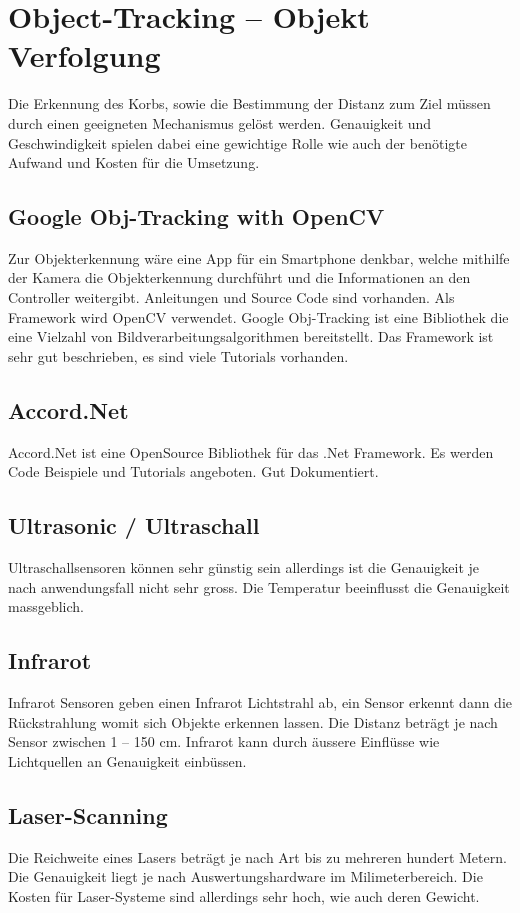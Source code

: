 \section{Object-Tracking – Objekt Verfolgung}
Die Erkennung des Korbs, sowie die Bestimmung der Distanz zum Ziel müssen durch einen geeigneten Mechanismus gelöst werden. Genauigkeit und Geschwindigkeit spielen dabei eine gewichtige Rolle wie auch der benötigte Aufwand und Kosten für die Umsetzung.

\subsection{Google Obj-Tracking with OpenCV}
Zur Objekterkennung wäre eine App für ein Smartphone denkbar, welche mithilfe der Kamera die Objekterkennung durchführt und die Informationen an den Controller weitergibt. Anleitungen und Source Code sind vorhanden. Als Framework wird OpenCV verwendet. Google Obj-Tracking ist eine Bibliothek die eine Vielzahl von Bildverarbeitungsalgorithmen bereitstellt. Das Framework ist sehr gut beschrieben, es sind viele Tutorials vorhanden.

\subsection{Accord.Net}
Accord.Net ist eine OpenSource Bibliothek für das .Net Framework. Es werden Code Beispiele und Tutorials angeboten. Gut Dokumentiert.

\subsection{Ultrasonic / Ultraschall }
Ultraschallsensoren können sehr günstig sein allerdings ist die Genauigkeit je nach anwendungsfall nicht sehr gross. Die Temperatur beeinflusst die Genauigkeit massgeblich. 

\subsection{Infrarot}
Infrarot Sensoren geben einen Infrarot Lichtstrahl ab, ein Sensor erkennt dann die Rückstrahlung womit sich Objekte erkennen lassen. Die Distanz beträgt je nach Sensor zwischen 1 – 150 cm. Infrarot kann durch äussere Einflüsse wie Lichtquellen an Genauigkeit einbüssen.

\subsection{Laser-Scanning}
Die Reichweite eines Lasers beträgt je nach Art bis zu mehreren hundert Metern. Die Genauigkeit liegt je nach Auswertungshardware im Milimeterbereich. Die Kosten für Laser-Systeme sind allerdings sehr hoch, wie auch deren Gewicht.

